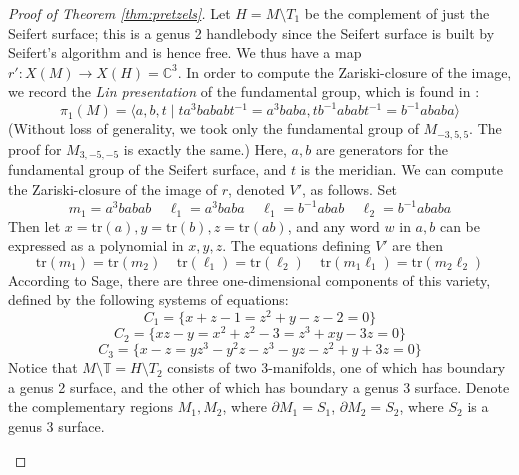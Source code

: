 \documentclass{article}
\theoremstyle{plain}
\theoremstyle{definition}
\theoremstyle{plain}
\theoremstyle{plain}
\theoremstyle{plain}
\theoremstyle{remark}
\theoremstyle{remark}
\theoremstyle{plain}
\theoremstyle{plain}
\begin{document}
\begin{proof}[Proof of Theorem \ref{thm:pretzels}]
Let $H = M \setminus T_1$ be the complement of just the Seifert surface; this is a genus 2 handlebody since the Seifert surface is built by Seifert's algorithm and is hence free. We thus have a map $r': X(M) \to X(H) = \mathbb{C}^3$. In order to compute the Zariski-closure of the image, we record the \emph{Lin presentation} of the fundamental group, which is found in \cite{sekino}:
\begin{equation}
	\pi_1(M) = \langle a, b, t \mid ta^3bababt^{-1} = a^3baba, tb^{-1}ababt^{-1} = b^{-1}ababa \rangle
\end{equation}
(Without loss of generality, we took only the fundamental group of $M_{-3, 5, 5}$. The proof for $M_{3, -5, -5}$ is exactly the same.) Here, $a, b$ are generators for the fundamental group of the Seifert surface, and $t$ is the meridian. We can compute the Zariski-closure of the image of $r$, denoted $V'$, as follows. Set 
\begin{equation}
	m_1 = a^3babab \ \ \ \ \ \ell_1 = a^3baba \ \ \ \ \ \ell_1 = b^{-1}abab \ \ \ \ \ \ell_2 = b^{-1}ababa
\end{equation}
Then let $x = \text{tr}(a), y = \text{tr}(b), z = \text{tr}(ab)$, and any word $w$ in $a, b$ can be expressed as a polynomial in $x, y, z$. The equations defining $V'$ are then
\begin{equation}
	\text{tr}(m_1) = \text{tr}(m_2) \ \ \ \ \ \text{tr}(\ell_1) = \text{tr}(\ell_2) \ \ \ \ \ \text{tr}(m_1\ell_1) = \text{tr}(m_2\ell_2)
\end{equation}
According to Sage, there are three one-dimensional components of this variety, defined by the following systems of equations:
\begin{equation}
	C_1 = \{x + z - 1 = z^2 + y - z - 2 = 0\}
\end{equation}
\begin{equation}
	C_2 = \{xz - y = x^2 + z^2 - 3 = z^3 + xy - 3z = 0\}
\end{equation}
\begin{equation}
	C_3 = \{x - z = yz^3 - y^2z - z^3 - yz - z^2 + y + 3z = 0\}
\end{equation}
Notice that $M \setminus \mathbb{T} = H \setminus T_2$ consists of two 3-manifolds, one of which has boundary a genus 2 surface, and the other of which has boundary a genus 3 surface. Denote the complementary regions $M_1, M_2$, where $\partial M_1 = S_1$, $\partial M_2 = S_2$, where $S_2$ is a genus 3 surface. 
\begin{figure}[h]

\end{figure}
\end{proof}
\end{document}
